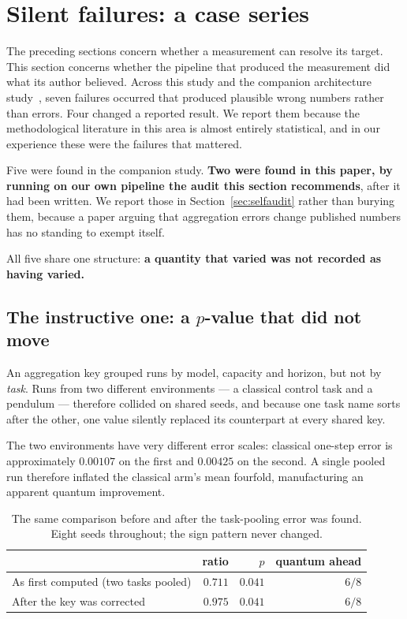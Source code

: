 \documentclass[11pt,onecolumn]{article}
\begin{document}
\section{Silent failures: a case series}\label{sec:silent}
The preceding sections concern whether a measurement can resolve its
target. This section concerns whether the pipeline that produced the
measurement did what its author believed. Across this study and the
companion architecture study~\cite{paperb}, seven failures occurred that
produced plausible wrong numbers rather than errors. Four changed a
reported result. We report them because the methodological literature in
this area is almost entirely statistical, and in our experience these
were the failures that mattered.

Five were found in the companion study. \textbf{Two were found in this
paper, by running on our own pipeline the audit this section
recommends}, after it had been written. We report those in
Section~\ref{sec:selfaudit} rather than burying them, because a paper
arguing that aggregation errors change published numbers has no standing
to exempt itself.

All five share one structure: \textbf{a quantity that varied was not
recorded as having varied.}

\subsection{The instructive one: a $p$-value that did not move}
\label{sec:pooling}
An aggregation key grouped runs by model, capacity and horizon, but not
by \emph{task}. Runs from two different environments --- a classical
control task and a pendulum --- therefore collided on shared seeds, and
because one task name sorts after the other, one value silently replaced
its counterpart at every shared key.

The two environments have very different error scales: classical
one-step error is approximately $0.00107$ on the first and $0.00425$ on
the second. A single pooled run therefore inflated the classical arm's
mean fourfold, manufacturing an apparent quantum improvement.

\begin{table}[htb]\centering\small
\caption{The same comparison before and after the task-pooling error
was found. Eight seeds throughout; the sign pattern never changed.}
\label{tab:pooling}
\begin{tabular}{lrrr}
\toprule
& ratio & $p$ & quantum ahead \\
\midrule
As first computed (two tasks pooled) & $\mathbf{0.711}$ & $0.041$ & $6/8$ \\
After the key was corrected          & $\mathbf{0.975}$ & $0.041$ & $6/8$ \\
\bottomrule
\end{tabular}
\end{table}
\end{document}
